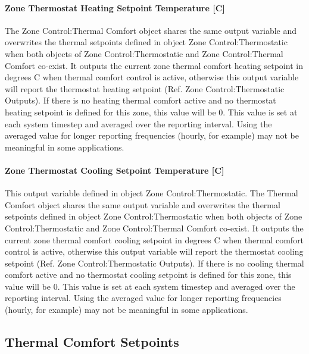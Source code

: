 \paragraph{Zone Thermostat Heating Setpoint Temperature {[}C{]}}\label{zone-thermostat-heating-setpoint-temperature-c-1}

The Zone Control:Thermal Comfort object shares the same output variable and overwrites the thermal setpoints defined in object Zone Control:Thermostatic when both objects of Zone Control:Thermostatic and Zone Control:Thermal Comfort co-exist. It outputs the current zone thermal comfort heating setpoint in degrees C when thermal comfort control is active, otherwise this output variable will report the thermostat heating setpoint (Ref. Zone Control:Thermostatic Outputs). If there is no heating thermal comfort active and no thermostat heating setpoint is defined for this zone, this value will be 0. This value is set at each system timestep and averaged over the reporting interval. Using the averaged value for longer reporting frequencies (hourly, for example) may not be meaningful in some applications.

\paragraph{Zone Thermostat Cooling Setpoint Temperature {[}C{]}}\label{zone-thermostat-cooling-setpoint-temperature-c-1}

This output variable defined in object Zone Control:Thermostatic. The Thermal Comfort object shares the same output variable and overwrites the thermal setpoints defined in object Zone Control:Thermostatic when both objects of Zone Control:Thermostatic and Zone Control:Thermal Comfort co-exist. It outputs the current zone thermal comfort cooling setpoint in degrees C when thermal comfort control is active, otherwise this output variable will report the thermostat cooling setpoint (Ref. Zone Control:Thermostatic Outputs). If there is no cooling thermal comfort active and no thermostat cooling setpoint is defined for this zone, this value will be 0. This value is set at each system timestep and averaged over the reporting interval. Using the averaged value for longer reporting frequencies (hourly, for example) may not be meaningful in some applications.

\subsection{Thermal Comfort Setpoints}\label{thermal-comfort-setpoints}


